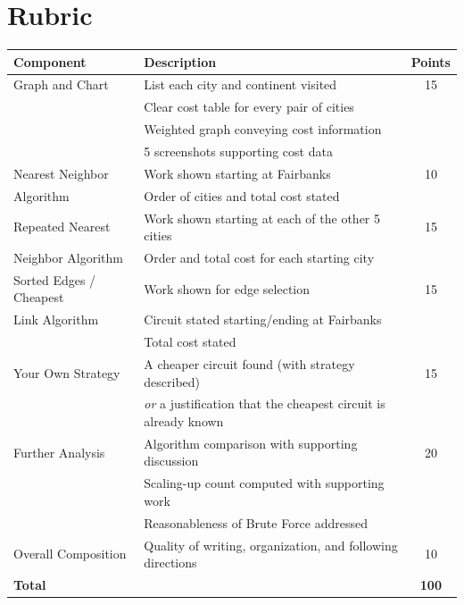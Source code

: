 \documentclass[11pt]{article}
\begin{document}
\vspace{-2pt}
\section*{\normalsize Rubric}
\vspace{-4pt}

\begin{center}
\renewcommand{\arraystretch}{1.15}
\begin{tabular}{l p{8.6cm} c}
\toprule
\textbf{Component} & \textbf{Description} & \textbf{Points} \\
\midrule
Graph and Chart
  & List each city and continent visited & 15 \\
  & Clear cost table for every pair of cities & \\
  & Weighted graph conveying cost information & \\
  & 5 screenshots supporting cost data & \\
\hline
Nearest Neighbor
   & Work shown starting at Fairbanks & 10 \\
 Algorithm & Order of cities and total cost stated & \\
\hline
Repeated Nearest
  & Work shown starting at each of the other 5 cities & 15 \\
Neighbor Algorithm  & Order and total cost for each starting city & \\
\hline
Sorted Edges / Cheapest
  & Work shown for edge selection & 15 \\
Link Algorithm & Circuit stated starting/ending at Fairbanks & \\
  & Total cost stated & \\
\hline
Your Own Strategy
  & A cheaper circuit found (with strategy described) & 15 \\
  & \textit{or} a justification that the cheapest circuit is already known & \\
\hline
Further Analysis
  & Algorithm comparison with supporting discussion & 20 \\
  & Scaling-up count computed with supporting work & \\
  & Reasonableness of Brute Force addressed & \\
\hline
Overall Composition
  & Quality of writing, organization, and following directions & 10 \\
\midrule
\textbf{Total} & & \textbf{100} \\
\bottomrule
\end{tabular}
\end{center}
\end{document}
